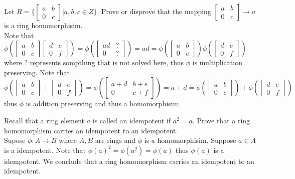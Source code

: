 \documentclass[12pt]{article}
\makeatletter
\theoremstyle{homework}
\newenvironment{exercise}[1]
{\def\@currentlabel{#1}\exercisecore}
{\endexercisecore}
\makeatother
\begin{document}
\begin{exercise}{15.16}
Let $R=\biggr\{\begin{bmatrix}
a & b \\ 0 & c
\end{bmatrix}
\biggr| a,b,c\in Z\biggr\}$. Prove or disprove that the mapping $\begin{bmatrix}
a & b \\ 0 & c
\end{bmatrix}\rightarrow a$ is a ring homomorphisim.\\
Note that $\phi(\begin{bmatrix}
a & b \\ 0 & c
\end{bmatrix}\begin{bmatrix}
d & e \\ 0 & f
\end{bmatrix})=\phi(\begin{bmatrix}
ad & ? \\ 0 & ?
\end{bmatrix})=ad=\phi(\begin{bmatrix}
a & b \\ 0 & c
\end{bmatrix})\phi(\begin{bmatrix}
d & e \\ 0 & f
\end{bmatrix})$ where $?$ represents sompthing that is not solved here, thus $\phi$ is multiplication preserving.  Note that $\phi(\begin{bmatrix}
a & b \\ 0 & c
\end{bmatrix}+\begin{bmatrix}
d & e \\ 0 & f
\end{bmatrix})=\phi(\begin{bmatrix}
a+d & b+e \\ 0 & c+f
\end{bmatrix})=a+d=\phi(\begin{bmatrix}
a & b \\ 0 & c
\end{bmatrix})+\phi(\begin{bmatrix}
d & e \\ 0 & f
\end{bmatrix})$ thus $\phi$ is addition preserving and thus a homomorphisim.
\end{exercise}

\begin{exercise}{15.20}
Recall that a ring element $a$ is called an idempotent if $a^2 = a$. Prove that a ring homomorphism carries an idempotent to an idempotent.\\
Supose $\phi:A\rightarrow B$ where $A,B$ are rings and $\phi$ is a homomorphisim.  Suppose $a\in A$ is a idempotent.  Note that $\phi(a)^2=\phi(a^2)=\phi(a)$ thus $\phi(a)$ is a idempotent.  We conclude that a ring homomorphism carries an idempotent to an idempotent.
\end{exercise}

\begin{exercise}{15.32}

\end{exercise}

\begin{exercise}{15.36}

\end{exercise}
\end{document}
